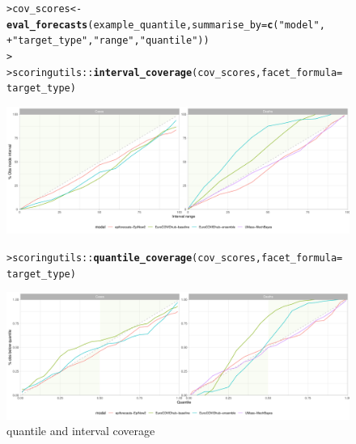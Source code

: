 \documentclass[article,shortnames]{jss}\usepackage[]{graphicx}\usepackage[]{color}
\makeatletter
\def\maxwidth{ %
  \ifdim\Gin@nat@width>\linewidth
    \linewidth
  \else
    \Gin@nat@width
  \fi
}
\newcommand{\hlstr}[1]{\textcolor[rgb]{0.192,0.494,0.8}{#1}}%
\newcommand{\hlopt}[1]{\textcolor[rgb]{0,0,0}{#1}}%
\newcommand{\hlstd}[1]{\textcolor[rgb]{0.345,0.345,0.345}{#1}}%
\newcommand{\hlkwb}[1]{\textcolor[rgb]{0.69,0.353,0.396}{#1}}%
\newcommand{\hlkwc}[1]{\textcolor[rgb]{0.333,0.667,0.333}{#1}}%
\newcommand{\hlkwd}[1]{\textcolor[rgb]{0.737,0.353,0.396}{\textbf{#1}}}%
\newenvironment{kframe}{%
 \def\at@end@of@kframe{}%
 \ifinner\ifhmode%
  \def\at@end@of@kframe{\end{minipage}}%
  \begin{minipage}{\columnwidth}%
 \fi\fi%
 \def\FrameCommand##1{\hskip\@totalleftmargin \hskip-\fboxsep
 \colorbox{shadecolor}{##1}\hskip-\fboxsep
     \hskip-\linewidth \hskip-\@totalleftmargin \hskip\columnwidth}%
 \MakeFramed {\advance\hsize-\width
   \@totalleftmargin\z@ \linewidth\hsize
   \@setminipage}}%
 {\par\unskip\endMakeFramed%
 \at@end@of@kframe}
\newenvironment{knitrout}{}{} %
\makeatother
\begin{document}
\begin{figure}[h!]
\centering
\begin{knitrout}
\color{fgcolor}\begin{kframe}
\begin{alltt}
\hlstd{> }\hlstd{cov_scores} \hlkwb{<-} \hlkwd{eval_forecasts}\hlstd{(example_quantile,} \hlkwc{summarise_by} \hlstd{=} \hlkwd{c}\hlstd{(}\hlstr{"model"}\hlstd{,}
\hlstd{+ }    \hlstr{"target_type"}\hlstd{,} \hlstr{"range"}\hlstd{,} \hlstr{"quantile"}\hlstd{))}
\hlstd{> }
\hlstd{> }\hlstd{scoringutils}\hlopt{::}\hlkwd{interval_coverage}\hlstd{(cov_scores,} \hlkwc{facet_formula} \hlstd{=} \hlopt{~}\hlstd{target_type)}
\end{alltt}
\end{kframe}
\includegraphics[width=\maxwidth]{plots/plot-coverage-1} 
\end{knitrout}


\begin{knitrout}
\color{fgcolor}\begin{kframe}
\begin{alltt}
\hlstd{> }\hlstd{scoringutils}\hlopt{::}\hlkwd{quantile_coverage}\hlstd{(cov_scores,} \hlkwc{facet_formula} \hlstd{=} \hlopt{~}\hlstd{target_type)}
\end{alltt}
\end{kframe}
\includegraphics[width=\maxwidth]{plots/plot-quantile-coverage-1} 
\end{knitrout}


\caption{\label{fig:coverage} quantile and interval coverage}
\end{figure}
\end{document}
